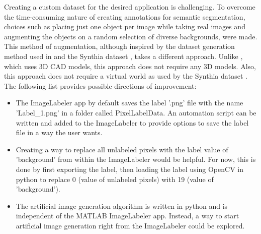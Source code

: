 Creating a custom dataset for the desired application is challenging. To overcome the time-consuming nature of creating annotations for semantic segmentation, choices such as placing just one object per image while taking real images and augmenting the objects on a random selection of diverse backgrounds, were made. This method of augmentation, although inspired by the dataset generation method used in \cite{DBLP:journals/corr/abs-1709-00849} and the Synthia dataset \cite{RosCVPR16}, takes a different approach. Unlike \cite{DBLP:journals/corr/abs-1709-00849}, which uses 3D CAD models, this approach does not require any 3D models. Also, this approach does not require a virtual world as used by the Synthia dataset \cite{RosCVPR16}. 
The following list provides possible directions of improvement:
	\begin{itemize}
		\item The ImageLabeler app by default saves the label '.png' file with the name 'Label\_1.png' in a folder called PixelLabelData. An automation script can be written and added to the ImageLabeler to provide options to save the label file in a way the user wants.
		\item Creating a way to replace all unlabeled pixels with the label value of 'background' from within the ImageLabeler would be helpful. For now, this is done by first exporting the label, then loading the label using OpenCV in python to replace 0 (value of unlabeled pixels) with 19 (value of 'background').
		\item The artificial image generation algorithm is written in python and is independent of the MATLAB ImageLabeler app. Instead, a way to start artificial image generation right from the ImageLabeler could be explored.
	\end{itemize}
	